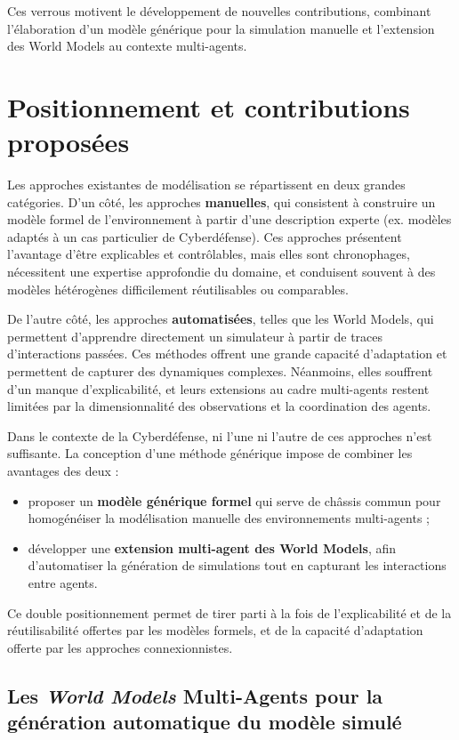 Ces verrous motivent le développement de nouvelles contributions, combinant l'élaboration d'un modèle générique pour la simulation manuelle et l'extension des World Models au contexte multi-agents.

\section{Positionnement et contributions proposées}

Les approches existantes de modélisation se répartissent en deux grandes catégories.
D'un côté, les approches \textbf{manuelles}, qui consistent à construire un modèle formel de l'environnement à partir d'une description experte (ex. modèles  adaptés à un cas particulier de Cyberdéfense). Ces approches présentent l'avantage d'être explicables et contrôlables, mais elles sont chronophages, nécessitent une expertise approfondie du domaine, et conduisent souvent à des modèles hétérogènes difficilement réutilisables ou comparables.

De l'autre côté, les approches \textbf{automatisées}, telles que les World Models, qui permettent d'apprendre directement un simulateur à partir de traces d'interactions passées. Ces méthodes offrent une grande capacité d'adaptation et permettent de capturer des dynamiques complexes. Néanmoins, elles souffrent d'un manque d'explicabilité, et leurs extensions au cadre multi-agents restent limitées par la dimensionnalité des observations et la coordination des agents.

Dans le contexte de la Cyberdéfense, ni l'une ni l'autre de ces approches n'est suffisante. La conception d'une méthode générique impose de combiner les avantages des deux :
\begin{itemize}
  \item proposer un \textbf{modèle générique formel} qui serve de châssis commun pour homogénéiser la modélisation manuelle des environnements multi-agents ;
  \item développer une \textbf{extension multi-agent des World Models}, afin d'automatiser la génération de simulations tout en capturant les interactions entre agents.
\end{itemize}

Ce double positionnement permet de tirer parti à la fois de l'explicabilité et de la réutilisabilité offertes par les modèles formels, et de la capacité d'adaptation offerte par les approches connexionnistes.


\subsection{Les \textit{World Models} Multi-Agents pour la génération automatique du modèle simulé}

